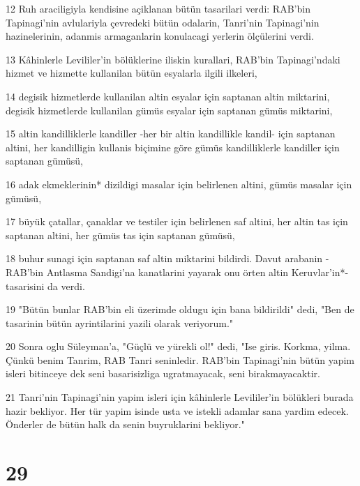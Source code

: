 \par 12 Ruh araciligiyla kendisine açiklanan bütün tasarilari verdi: RAB'bin Tapinagi'nin avlulariyla çevredeki bütün odalarin, Tanri'nin Tapinagi'nin hazinelerinin, adanmis armaganlarin konulacagi yerlerin ölçülerini verdi.
\par 13 Kâhinlerle Levililer'in bölüklerine iliskin kurallari, RAB'bin Tapinagi'ndaki hizmet ve hizmette kullanilan bütün esyalarla ilgili ilkeleri,
\par 14 degisik hizmetlerde kullanilan altin esyalar için saptanan altin miktarini, degisik hizmetlerde kullanilan gümüs esyalar için saptanan gümüs miktarini,
\par 15 altin kandilliklerle kandiller -her bir altin kandillikle kandil- için saptanan altini, her kandilligin kullanis biçimine göre gümüs kandilliklerle kandiller için saptanan gümüsü,
\par 16 adak ekmeklerinin* dizildigi masalar için belirlenen altini, gümüs masalar için gümüsü,
\par 17 büyük çatallar, çanaklar ve testiler için belirlenen saf altini, her altin tas için saptanan altini, her gümüs tas için saptanan gümüsü,
\par 18 buhur sunagi için saptanan saf altin miktarini bildirdi. Davut arabanin -RAB'bin Antlasma Sandigi'na kanatlarini yayarak onu örten altin Keruvlar'in*- tasarisini da verdi.
\par 19 "Bütün bunlar RAB'bin eli üzerimde oldugu için bana bildirildi" dedi, "Ben de tasarinin bütün ayrintilarini yazili olarak veriyorum."
\par 20 Sonra oglu Süleyman'a, "Güçlü ve yürekli ol!" dedi, "Ise giris. Korkma, yilma. Çünkü benim Tanrim, RAB Tanri seninledir. RAB'bin Tapinagi'nin bütün yapim isleri bitinceye dek seni basarisizliga ugratmayacak, seni birakmayacaktir.
\par 21 Tanri'nin Tapinagi'nin yapim isleri için kâhinlerle Levililer'in bölükleri burada hazir bekliyor. Her tür yapim isinde usta ve istekli adamlar sana yardim edecek. Önderler de bütün halk da senin buyruklarini bekliyor."

\chapter{29}


